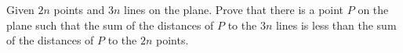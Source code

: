 Given $2n$ points and $3n$ lines on the plane. Prove that there is a point $P$ on the plane such that the sum of the distances of $P$ to the $3n$ lines is less than the sum of the distances of $P$ to the $2n$ points.